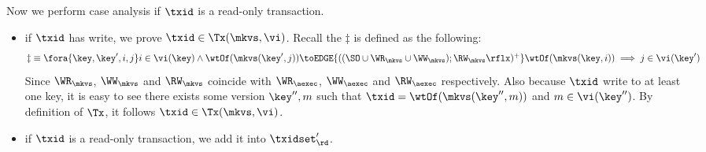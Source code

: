 \begin{itemize}
\begin{itemize}
Now we perform case analysis if \( \txid \) is a read-only transaction.
\begin{itemize}
    \item if \( \txid \) has write, we prove \( \txid \in \Tx(\mkvs, \vi)\).
        Recall the \( \ddagger \) is defined as the following:
        \begin{gather}
            \begin{array}{@{}l@{}}
                \ddagger \equiv 
                \fora{\key, \key', i, j}
                i \in \vi(\key)
                \wedge \wtOf(\mkvs(\key', j))\toEDGE{((\SO \cup \WR_{\mkvs} \cup \WW_{\mkvs}) ; \RW_{\mkvs}\rflx)^{+}} \wtOf(\mkvs(\key, i))
                \implies j \in \vi(\key')    
            \end{array} 
            \label{equ:si-dagger}
        \end{gather}
        Since \( \WR_\mkvs \), \( \WW_\mkvs \) and \( \RW_\mkvs \) coincide with
        \( \WR_\aexec \), \( \WW_\aexec \) and \( \RW_\aexec \) respectively.
        Also because \( \txid \) write to at least one key,
        it is easy to see there exists some version \( \key'',m\) such that 
        \( \txid = \wtOf(\mkvs(\key'',m))\) and \( m \in \vi(\key'')\).
        By definition of \( \Tx \), it follows \( \txid \in \Tx(\mkvs, \vi) \).
    \item if \( \txid \) is a read-only transaction, we add it into \( \txidset'_\rd \).
\end{itemize}


\end{itemize}
\end{itemize}

